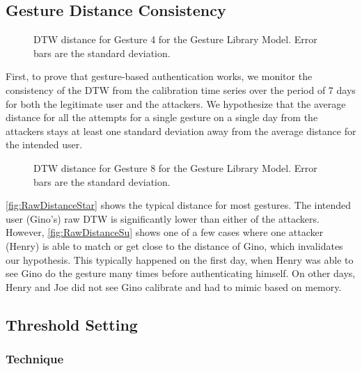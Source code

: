 \subsection{Gesture Distance Consistency}

\begin{figure}[!tb]
\centering
 \tikzdefaultformatgraph
   
   \caption{DTW distance for Gesture 4 for the Gesture Library Model. Error bars are the standard deviation.}
  \label{fig:RawDistanceStar}
\end{figure}

First, to prove that gesture-based authentication works, we monitor the consistency of the \gls{DTW} from the calibration time series over the period of 7 days for both the legitimate user and the attackers. We hypothesize that the average distance for all the attempts for a single gesture on a single day from the attackers stays at least one standard deviation away from the average distance for the intended user. 

\begin{figure}[!h]
\centering
 \tikzdefaultformatgraph
   
   \caption{DTW distance for Gesture 8 for the Gesture Library Model. Error bars are the standard deviation.}
  \label{fig:RawDistanceSu}
\end{figure}

\autoref{fig:RawDistanceStar} shows the typical distance for most gestures. The intended user (Gino's) raw \gls{DTW} is significantly lower than either of the attackers. However, \autoref{fig:RawDistanceSu} shows one of a few cases where one attacker (Henry) is able to match or get close to the distance of Gino, which invalidates our hypothesis. This typically happened on the first day, when Henry was able to see Gino do the gesture many times before authenticating himself. On other days, Henry and Joe did not see Gino calibrate and had to mimic based on memory. 

\subsection{Threshold Setting}
\label{subsec:thres}

\subsubsection{Technique}

